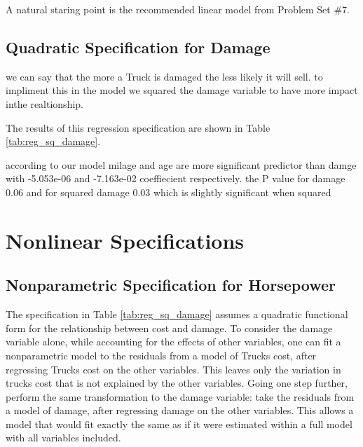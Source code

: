 \documentclass[11pt]{paper}
\begin{document}
A natural staring point is the recommended linear model
from Problem Set \#7. 

\subsection{Quadratic Specification for Damage}

we can say that the more a Truck is damaged the less likely it will sell. 
to impliment this in the model we squared the damage variable to have more impact inthe realtionship.


The results of this regression specification are shown in 
Table \ref{tab:reg_sq_damage}. 
% 

% 
according to our model milage and age are more significant predictor than damge with -5.053e-06 and -7.163e-02 coeffiecient respectively. 
the P value for damage 0.06 and for squared damage 0.03 which is slightly significant when squared







\clearpage
\section{Nonlinear Specifications}


\subsection{Nonparametric Specification for Horsepower}


The specification in 
Table \ref{tab:reg_sq_damage}
assumes a quadratic functional form for
the relationship between cost and damage. 
To consider the damage variable alone, 
while accounting for the effects of other variables, 
one can fit a nonparametric model to the residuals 
from a model of Trucks cost, 
after regressing Trucks cost on the other variables. 
This leaves only the variation in trucks cost that is not explained by the other variables. 
Going one step further, perform the same transformation to the damage variable:
take the residuals from a model of damage, 
after regressing damage on the other variables. 
This allows a model that would fit exactly the same as if it were estimated within a full model with all variables included. 
\end{document}
